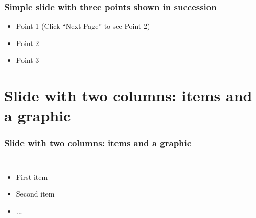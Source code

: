 \documentclass[]{beamer}
\begin{document}
\begin{frame}
  \frametitle{Simple slide with three points shown in succession}   %

  \begin{itemize}
  \item<1-> Point 1 (Click ``Next Page'' to see Point 2) %
  \item<2-> Point 2  %
  \item<3-> Point 3
  \end{itemize}
\end{frame}


\section{Slide with two columns: items and a graphic}

\begin{frame}
  \frametitle{Slide with two columns: items and a graphic}   %
  \begin{columns}[c]
  \column{2in}  %
  \begin{itemize}
  \item<1-> First item
  \item<2-> Second item
  \item<3-> ...
  \end{itemize}
  \column{2in}
  \end{columns}
\end{frame}
\end{document}
